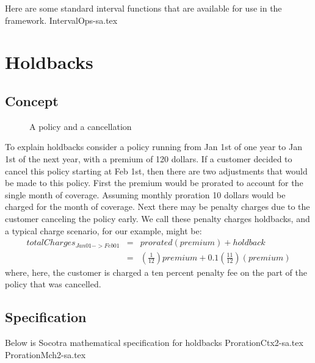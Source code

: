 Here are some standard interval functions that are available for use in the framework.
{IntervalOps-sa.tex}

\section{Holdbacks}
\label{sec:03:3}

\subsection{Concept}

\begin{figure}[ht]
  \caption{
    A policy and a cancellation
  }
  \label{fig:3:1}
\end{figure}

To explain holdbacks consider a policy running from Jan 1st of one year to Jan 1st of the next year, with a
premium of 120 dollars. If
a customer decided to cancel this policy starting at Feb 1st, then there are two adjustments that would
be made to this policy. First the premium would be prorated to account for the single month of coverage.
Assuming monthly proration 10 dollars would be charged for the month of coverage. Next there may be penalty
charges due to the customer canceling the policy early. We call these penalty charges holdbacks, and a typical
charge scenario, for our example, might be:
\begin{eqnarray*}
totalCharges_{Jan01->Feb01} & = & prorated(premium) + holdback \\
                          & = & (\frac{1}{12}) premium + 0.1(\frac{11}{12})(premium)
\end{eqnarray*}
where, here, the customer is charged a ten percent penalty fee on the part of the policy that was cancelled.


\subsection{Specification}

Below is Socotra mathematical specification for holdbacks
{ProrationCtx2-sa.tex}
{ProrationMch2-sa.tex}

